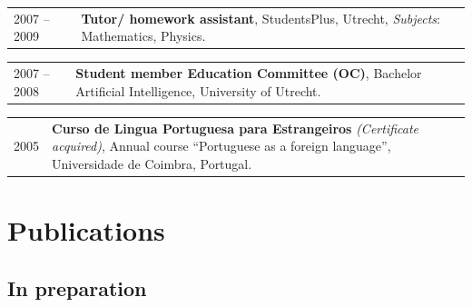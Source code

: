 \documentclass[a4paper,10pt]{article}
\def\leftcolwidth{.12\textwidth}
\def\tablevspace{10pt}
\begin{document}
\vspace{\tablevspace}

%

\noindent
\begin{tabularx}{\textwidth}{ p{\leftcolwidth} X }
  2007 -- 2009
  & \textbf{Tutor/ homework assistant}, StudentsPlus, Utrecht,
    \textit{Subjects}: Mathematics, Physics.
\end{tabularx}

\vspace{\tablevspace}

\noindent
\begin{tabularx}{\textwidth}{ p{\leftcolwidth} X }
  2007 -- 2008
  & \textbf{Student member Education Committee (OC)},
    Bachelor Artificial Intelligence, University of Utrecht.\\
\end{tabularx}

\vspace{\tablevspace}

\noindent
\begin{tabularx}{\textwidth}{ p{\leftcolwidth} X }
  2005 & \textbf{Curso de Lingua Portuguesa para Estrangeiros} 
         \textit{(Certificate acquired)}, Annual course ``Portuguese as a
         foreign language'', Universidade de Coimbra, Portugal.
\end{tabularx}




\section*{Publications}

\subsection*{In preparation}
\end{document}

